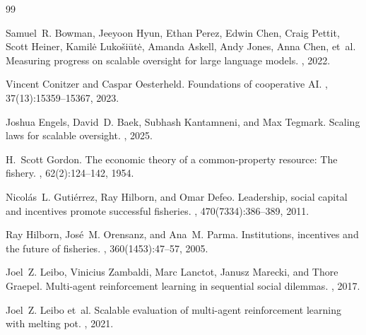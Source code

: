 \documentclass[10pt]{article}
\begin{document}
\small

\begin{thebibliography}{99}

Samuel~R. Bowman, Jeeyoon Hyun, Ethan Perez, Edwin Chen, Craig Pettit, Scott Heiner, Kamilė Lukošiūtė, Amanda Askell, Andy Jones, Anna Chen, et~al.
\newblock Measuring progress on scalable oversight for large language models.
, 2022.

Vincent Conitzer and Caspar Oesterheld.
\newblock Foundations of cooperative {AI}.
, 37(13):15359--15367, 2023.

Joshua Engels, David~D. Baek, Subhash Kantamneni, and Max Tegmark.
\newblock Scaling laws for scalable oversight.
, 2025.

H.~Scott Gordon.
\newblock The economic theory of a common-property resource: The fishery.
, 62(2):124--142, 1954.

Nicolás~L. Gutiérrez, Ray Hilborn, and Omar Defeo.
\newblock Leadership, social capital and incentives promote successful fisheries.
, 470(7334):386--389, 2011.

Ray Hilborn, José~M. Orensanz, and Ana~M. Parma.
\newblock Institutions, incentives and the future of fisheries.
, 360(1453):47--57, 2005.

Joel~Z. Leibo, Vinicius Zambaldi, Marc Lanctot, Janusz Marecki, and Thore Graepel.
\newblock Multi-agent reinforcement learning in sequential social dilemmas.
, 2017.

Joel~Z. Leibo et~al.
\newblock Scalable evaluation of multi-agent reinforcement learning with melting pot.
, 2021.


\end{thebibliography}
\end{document}
